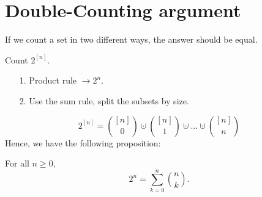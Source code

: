 \section{Double-Counting argument}
If we count a set in two different ways, the answer should be equal. 
\begin{eg}
  Count \(2^{[n]}\). 
\end{eg}
\begin{explanation}
  \vphantom{text}
  \begin{itemize}
    \item [1.] Product rule \(\to 2^n\). 
    \item [2.] Use the sum rule, split the subsets by size. 
  \end{itemize}
      \[
        2^{[n]} = \binom{[n]}{0} \cupdot \binom{[n]}{1} \cupdot \dots \cupdot \binom{[n]}{n}
      \]
    Hence, we have the following proposition: 
    \begin{proposition}
      For all \(n \ge 0\), 
      \[
        2^n = \sum_{k=0}^n \binom{n}{k}. 
      \] 
    \end{proposition}
\end{explanation}


